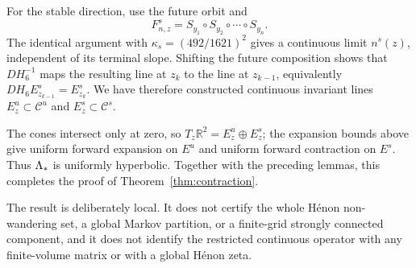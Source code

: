For the stable direction, use the future orbit and
\[
 F^s_{n,z}=S_{y_1}\circ S_{y_2}\circ\cdots\circ S_{y_n}.
\]
The identical argument with $\kappa_s=(492/1621)^2$ gives a continuous limit
$n^s(z)$, independent of its terminal slope.  Shifting the future composition
shows that $DH_6^{-1}$ maps the resulting line at $z_k$ to the line at
$z_{k-1}$, equivalently $DH_6 E^s_{z_{k-1}}=E^s_{z_k}$.  We have therefore
constructed continuous invariant lines
$E^u_z\subset\mathcal C^u$ and $E^s_z\subset\mathcal C^s$.

The cones intersect only at zero, so
$T_z\mathbb R^2=E^u_z\oplus E^s_z$; the expansion bounds above give uniform
forward expansion on $E^u$ and uniform forward contraction on $E^s$.  Thus
$\Lambda_*$ is uniformly hyperbolic.  Together with the preceding lemmas, this
completes the proof of Theorem~\ref{thm:contraction}.

The result is deliberately local.  It does not certify the whole H\'enon
non-wandering set, a global Markov partition, or a finite-grid strongly
connected component, and it does not identify the restricted continuous
operator with any finite-volume matrix or with a global H\'enon zeta.
